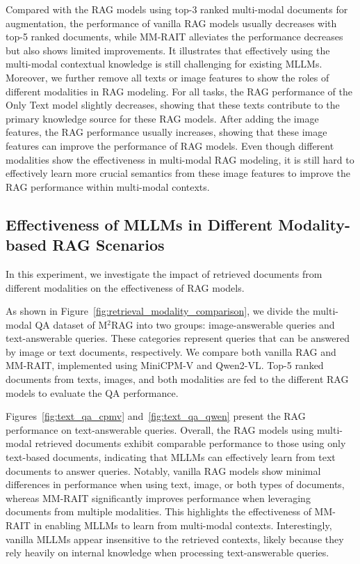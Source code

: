 Compared with the RAG models using top-3 ranked multi-modal documents for augmentation, the performance of vanilla RAG models usually decreases with top-5 ranked documents, while MM-RAIT alleviates the performance decreases but also shows limited improvements. It illustrates that effectively using the multi-modal contextual knowledge is still challenging for existing MLLMs. Moreover, we further remove all texts or image features to show the roles of different modalities in RAG modeling. For all tasks, the RAG performance of the Only Text model slightly decreases, showing that these texts contribute to the primary knowledge source for these RAG models. After adding the image features, the RAG performance usually increases, showing that these image features can improve the performance of RAG models. Even though different modalities show the effectiveness in multi-modal RAG modeling, it is still hard to effectively learn more crucial semantics from these image features to improve the RAG performance within multi-modal contexts.

\subsection{Effectiveness of MLLMs in Different Modality-based RAG Scenarios}
In this experiment, we investigate the impact of retrieved documents from different modalities on the effectiveness of RAG models.

As shown in Figure~\ref{fig:retrieval_modality_comparison}, we divide the multi-modal QA dataset of M$^2$RAG into two groups: image-answerable queries and text-answerable queries. These categories represent queries that can be answered by image or text documents, respectively. We compare both vanilla RAG and MM-RAIT, implemented using MiniCPM-V and Qwen2-VL. Top-5 ranked documents from texts, images, and both modalities are fed to the different RAG models to evaluate the QA performance.

Figures~\ref{fig:text_qa_cpmv} and~\ref{fig:text_qa_qwen} present the RAG performance on text-answerable queries. Overall, the RAG models using multi-modal retrieved documents exhibit comparable performance to those using only text-based documents, indicating that MLLMs can effectively learn from text documents to answer queries. Notably, vanilla RAG models show minimal differences in performance when using text, image, or both types of documents, whereas MM-RAIT significantly improves performance when leveraging documents from multiple modalities. This highlights the effectiveness of MM-RAIT in enabling MLLMs to learn from multi-modal contexts. Interestingly, vanilla MLLMs appear insensitive to the retrieved contexts, likely because they rely heavily on internal knowledge when processing text-answerable queries.

